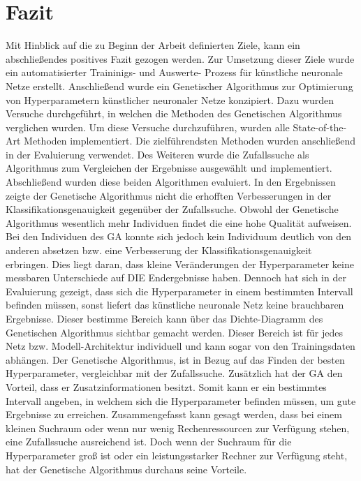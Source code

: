 \section{Fazit}
Mit Hinblick auf die zu Beginn der Arbeit definierten Ziele, kann ein abschließendes positives Fazit gezogen werden. Zur Umsetzung dieser Ziele wurde ein automatisierter Traininigs- und Auswerte- Prozess für künstliche neuronale Netze erstellt. Anschließend wurde ein Genetischer Algorithmus zur Optimierung von Hyperparametern künstlicher neuronaler Netze konzipiert. Dazu wurden Versuche durchgeführt, in welchen die Methoden des Genetischen Algorithmus verglichen wurden. Um diese Versuche durchzuführen, wurden alle State-of-the-Art Methoden implementiert. Die zielführendsten Methoden wurden anschließend in der Evaluierung verwendet. Des Weiteren wurde die Zufallssuche als Algorithmus zum Vergleichen der Ergebnisse ausgewählt und implementiert. Abschließend wurden diese beiden Algorithmen evaluiert. In den Ergebnissen zeigte der Genetische Algorithmus nicht die erhofften Verbesserungen in der Klassifikationsgenauigkeit gegenüber der Zufallssuche. Obwohl der Genetische Algorithmus wesentlich mehr Individuen findet die eine hohe Qualität aufweisen. Bei den Individuen des GA konnte sich jedoch kein Individuum deutlich von den anderen absetzen bzw. eine Verbesserung der Klassifikationsgenauigkeit erbringen. Dies liegt daran, dass kleine Veränderungen der Hyperparameter keine messbaren Unterschiede auf DIE Endergebnisse haben. Dennoch hat sich in der Evaluierung gezeigt, dass sich die Hyperparameter in einem bestimmten Intervall befinden müssen, sonst liefert das künstliche neuronale Netz keine brauchbaren Ergebnisse. Dieser bestimme Bereich kann über das Dichte-Diagramm des Genetischen Algorithmus sichtbar gemacht werden. Dieser Bereich ist für jedes Netz bzw. Modell-Architektur individuell und kann sogar von den Trainingsdaten abhängen. Der Genetische Algorithmus, ist in Bezug auf das Finden der besten Hyperparameter, vergleichbar mit der Zufallssuche. Zusätzlich hat der GA den Vorteil, dass er Zusatzinformationen besitzt. Somit kann er ein bestimmtes Intervall angeben, in welchem sich die Hyperparameter befinden müssen, um gute Ergebnisse zu erreichen. Zusammengefasst kann gesagt werden, dass bei einem kleinen Suchraum oder wenn nur wenig Rechenressourcen zur Verfügung stehen, eine Zufallssuche ausreichend ist. Doch wenn der Suchraum für die Hyperparameter groß ist oder ein leistungsstarker Rechner zur Verfügung steht, hat der Genetische Algorithmus durchaus seine Vorteile.


